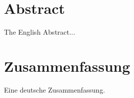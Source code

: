 

\chapter*{Abstract}
\thispagestyle{empty}

The English Abstract...



\chapter*{Zusammenfassung}
\thispagestyle{empty}

Eine deutsche Zusammenfassung.